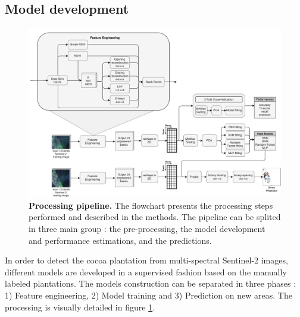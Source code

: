 \documentclass[a4paper, 12pt]{article}
\begin{document}
    \subsection{Model development}
        \begin{figure}[t]
            \centering
            \includegraphics[width=1\textwidth]{../Figures/ProcessingDiagram.png}
            \caption{\textbf{Processing pipeline.} The flowchart presents the processing steps performed and described in the methods. The pipeline can be splited in three main group : the pre-processing, the model development and performance estimations, and the predictions.}
            \label{fig:processing}
        \end{figure}

        In order to detect the cocoa plantation from multi-spectral Sentinel-2 images, different models are developed in a supervised fashion based on the manually labeled plantations. The models construction can be separated in three phases : 1) Feature engineering, 2) Model training and 3) Prediction on new areas. The processing is visually detailed in figure \ref{fig:processing}.
\end{document}
